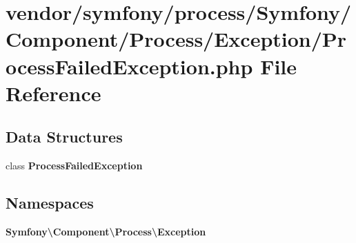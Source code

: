 \section{vendor/symfony/process/\+Symfony/\+Component/\+Process/\+Exception/\+Process\+Failed\+Exception.php File Reference}
\label{_process_failed_exception_8php}
\subsection*{Data Structures}
\begin{DoxyCompactItemize}
\item 
class {\bf Process\+Failed\+Exception}
\end{DoxyCompactItemize}
\subsection*{Namespaces}
\begin{DoxyCompactItemize}
\item 
 {\bf Symfony\textbackslash{}\+Component\textbackslash{}\+Process\textbackslash{}\+Exception}
\end{DoxyCompactItemize}
